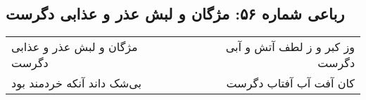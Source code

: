 \begin{center}
\section*{رباعی شماره ۵۶: مژگان و لبش عذر و عذابی دگرست}
\label{sec:sh056}
\begin{longtable}{l p{0.5cm} r}
مژگان و لبش عذر و عذابی دگرست
&&
وز کبر و ز لطف آتش و آبی دگرست
\\
بی‌شک داند آنکه خردمند بود
&&
کان آفت آب آفتاب دگرست
\\
\end{longtable}
\end{center}
